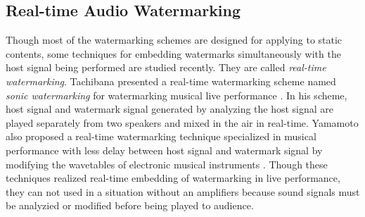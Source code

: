 \subsection{Real-time Audio Watermarking}
Though most of the watermarking schemes are designed for applying to static contents, some techniques for embedding watermarks simultaneously with the host signal being performed are studied recently. They are called {\it real-time watermarking}.
Tachibana presented a real-time watermarking scheme named {\it sonic watermarking} for watermarking musical live performance \cite{tachibana2003audio}. In his scheme, host signal and watermark signal generated by analyzing the host signal are played separately from two speakers and mixed in the air in real-time.
Yamamoto also proposed a real-time watermarking technique specialized in musical performance with less delay between host signal and watermark signal by modifying the wavetables of electronic musical instruments \cite{yamamoto2010real}.
Though these techniques realized real-time embedding of watermarking in live performance, they can not used in a situation without an amplifiers because sound signals must be analyzied or modified before being played to audience.
